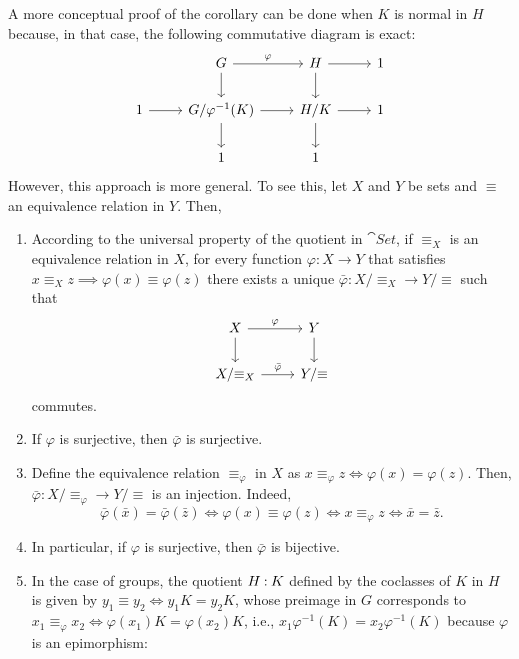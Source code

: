 \begin{rem}\label{rem:bijective-coclasses}
    A more conceptual proof of the corollary can be done when $K$ is normal in $H$ because, in that case, the following commutative diagram is exact:
    \small
    $$
        \begin{tikzcd}
            &G\arrow[r,"\varphi"]\arrow[d]&H\arrow[r]\arrow[d]&1\\
            1\arrow[r]&G/\varphi^{-1}(K)\arrow[r]\arrow[d]
                &H/K\arrow[r]\arrow[d]&1\\
                &1&1
        \end{tikzcd}
    $$
    \normalsize
    However, this approach is more general. To see this, let $X$ and $Y$ be sets and $\equiv$ an equivalence relation in $Y$. Then,
    \begin{enumerate}[-]
        \item According to the universal property of the quotient in $\cat{Set}$, if $\equiv_X$ is an equivalence relation in $X$, for every function $\varphi\colon X\to Y$ that satisfies $x\equiv_X z\implies\varphi(x)\equiv\varphi(z)$ there exists a unique $\bar\varphi\colon X/{\equiv_X}\to Y/{\equiv}$ such that
        $$
            \begin{tikzcd}
                X
                        \arrow[r,"\varphi"]
                        \arrow[d]
                    &Y
                        \arrow[d]\\
                X/{\equiv_X}
                        \arrow[r,"\bar\varphi"]
                    &Y/{\equiv}
            \end{tikzcd}
        $$
        commutes.
        \item If $\varphi$ is surjective, then $\bar\varphi$ is surjective.
        \item Define the equivalence relation $\equiv_\varphi$ in $X$ as $x\equiv_\varphi z\iff\varphi(x)=\varphi(z)$. Then, $\bar \varphi\colon X/{\equiv_\varphi}\to Y/{\equiv}$ is an injection. Indeed,
        $$
            \bar\varphi(\bar x)=\bar\varphi(\bar z)
                \iff\varphi(x)\equiv\varphi(z)
                \iff x\equiv_\varphi z
                \iff \bar x=\bar z.
        $$
        \item In particular, if $\varphi$ is surjective, then $\bar\varphi$ is bijective.
        \item In the case of groups, the quotient $H\mathbin:K$ defined by the coclasses of $K$ in $H$ is given by $y_1\equiv y_2\iff y_1K=y_2K$, whose preimage in $G$ corresponds to $x_1\equiv_\varphi x_2\iff \varphi(x_1)K=\varphi(x_2)K$, i.e., $x_1\varphi^{-1}(K)=x_2\varphi^{-1}(K)$ because $\varphi$ is an epimorphism:

\end{enumerate}
\end{rem}
